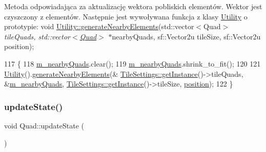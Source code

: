 Metoda odpowiadająca za aktualizację wektora pobliskich elementów. Wektor jest czyszczony z elementów. Następnie jest wywoływana funkcja z klasy \mbox{\hyperlink{class_utility}{Utility}} o prototypie\+: void \mbox{\hyperlink{class_utility_ae89bf9504ce0848783234853483da262}{Utility\+::generate\+Nearby\+Elements}}(std\+::vector$<$\+Quad$>$ {\itshape tile\+Quads, std\+::vector$<$\mbox{\hyperlink{class_quad}{Quad}}}$>$ $\ast$nearby\+Quads, sf\+::\+Vector2u tile\+Size, sf\+::\+Vector2u position); 
\begin{DoxyCode}
117 \{
118     \mbox{\hyperlink{class_quad_ad66d1a97fdbecb53ea43af7361b4f124}{m\_nearbyQuads}}.clear();
119     \mbox{\hyperlink{class_quad_ad66d1a97fdbecb53ea43af7361b4f124}{m\_nearbyQuads}}.shrink\_to\_fit();
120 
121     \mbox{\hyperlink{class_utility}{Utility}}().\mbox{\hyperlink{class_utility_ae89bf9504ce0848783234853483da262}{generateNearbyElements}}(&
      \mbox{\hyperlink{class_tile_settings_a003ae6e78b97855c8592b2b4c0818914}{TileSettings::getInstance}}()->tileQuads, &\mbox{\hyperlink{class_quad_ad66d1a97fdbecb53ea43af7361b4f124}{m\_nearbyQuads}}, 
      \mbox{\hyperlink{class_tile_settings_a003ae6e78b97855c8592b2b4c0818914}{TileSettings::getInstance}}()->tileSize, \mbox{\hyperlink{class_quad_af0820dc173ffac240bcfe0a19dc2fe8a}{position}});
122 \}
\end{DoxyCode}
\mbox{\label{class_quad_aed458aa7db6bf84c6a3060339c6a27c0}} 
\subsubsection{\texorpdfstring{update\+State()}{updateState()}}
{\footnotesize\ttfamily void Quad\+::update\+State (\begin{DoxyParamCaption}{ }\end{DoxyParamCaption})}

